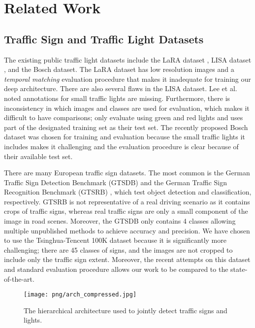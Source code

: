 \documentclass[10pt, conference, compsocconf]{IEEEtran}
\begin{document}
\section{Related Work} \label{related_work}

\subsection{Traffic Sign and Traffic Light Datasets}
The existing public traffic light datasets include the LaRA dataset \cite{lara}, LISA dataset \cite{lisa1, lisa2}, and the Bosch dataset. The LaRA dataset has low resolution images and a \textit{temporal matching} evaluation procedure that makes it inadequate for training our deep architecture. There are also several flaws in the LISA dataset. Lee et al. \cite{lee} noted annotations for small traffic lights are missing. Furthermore, there is inconsistency in which images and classes are used for evaluation, which makes it difficult to have comparisons; \cite{lee,li2017a} only evaluate using green and red lights and \cite{lee} uses part of the designated training set as their test set. The recently proposed Bosch dataset was chosen for training and evaluation because the small traffic lights it includes makes it challenging and the evaluation procedure is clear because of their available test set.

There are many European traffic sign datasets. The most common is the German Traffic Sign Detection Benchmark (GTSDB) \cite{GTSDB} and the German Traffic Sign Recognition Benchmark (GTSRB) \cite{GTSRB}, which test object detection and classification, respectively. GTSRB is not representative of a real driving scenario as it contains crops of traffic signs, whereas real traffic signs are only a small component of the image in road scenes. Moreover, the GTSDB only contains 4 classes allowing multiple unpublished methods to achieve  accuracy and precision.  We have chosen to use the Tsinghua-Tencent 100K dataset because it is significantly more challenging; there are 45 classes of signs, and the images are not cropped to include only the traffic sign extent. Moreover, the recent attempts \cite{tencent, perceptual_gan, meng} on this dataset and standard evaluation procedure allows our work to be compared to the state-of-the-art.

\begin{figure*}[t]
\begin{center}
\texttt{[image: png/arch\_compressed.jpg]}
\end{center}
\caption{The hierarchical architecture used to jointly detect traffic signs and lights.}
\label{arch}
\end{figure*}
\end{document}
